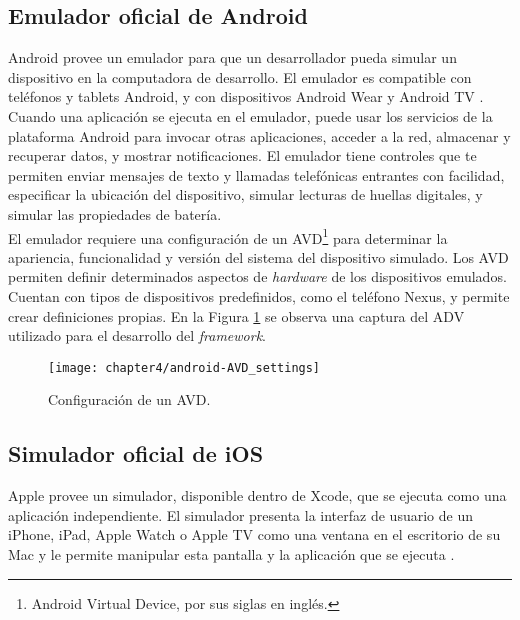 \subsection{Emulador oficial de Android}
Android provee un emulador para que un desarrollador pueda simular un dispositivo en la computadora de desarrollo. El emulador es compatible con teléfonos y tablets Android, y con dispositivos Android Wear y Android TV \cite{daemu}.\\

Cuando una aplicación se ejecuta en el emulador, puede usar los servicios de la plataforma Android para invocar otras aplicaciones, acceder a la red, almacenar y recuperar datos, y mostrar notificaciones. El emulador tiene controles que te permiten enviar mensajes de texto y llamadas telefónicas entrantes con facilidad, especificar la ubicación del dispositivo, simular lecturas de huellas digitales, y simular las propiedades de batería.\\

El emulador requiere una configuración de un AVD\footnote{Android Virtual Device, por sus siglas en inglés.} para determinar la apariencia, funcionalidad y versión del sistema del dispositivo simulado. Los AVD permiten definir determinados aspectos de \emph{hardware} de los dispositivos emulados. Cuentan con tipos de dispositivos predefinidos, como el teléfono Nexus, y permite crear definiciones propias. En la Figura \ref{fig:ch05:androidAVDsettings} se observa una captura del ADV utilizado para el desarrollo del \emph{framework}.
\begin{figure}[htbp]
    \centering
	\texttt{[image: chapter4/android-AVD\_settings]}
	\caption{Configuración de un AVD.}
    \label{fig:ch05:androidAVDsettings}
\end{figure}
\subsection{Simulador oficial de iOS}
Apple provee un simulador, disponible dentro de Xcode, que se ejecuta como una aplicación independiente. El simulador presenta la interfaz de usuario de un iPhone, iPad, Apple Watch o Apple TV como una ventana en el escritorio de su Mac y le permite manipular esta pantalla y la aplicación que se ejecuta \cite{iosds}.\\


